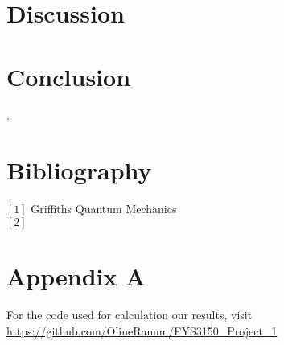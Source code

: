\documentclass[%
reprint,
amsmath,amssymb,
aps,
]{revtex4-1}
\begin{document}
\section*{Discussion} 

\section*{Conclusion}


\newpage .
\newpage 
\onecolumngrid
\section*{Bibliography}
\noindent $[1]$ Griffiths Quantum Mechanics\\ 
$[2]$
\section*{Appendix A}
For the code used for calculation our results, visit
\url{https://github.com/OlineRanum/FYS3150_Project_1}
\end{document}

